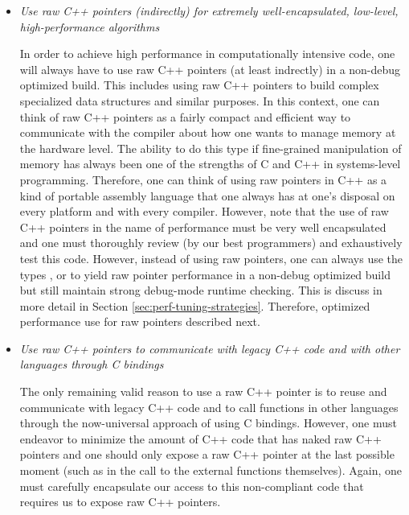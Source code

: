 \documentclass[pdf,ps2pdf,11pt]{SANDreport}
\begin{document}
\begin{itemize}

{}\item{}\textit{Use raw C++ pointers (indirectly) for extremely
well-encapsulated, low-level, high-performance algorithms}

In order to achieve high performance in computationally intensive
code, one will always have to use raw C++ pointers (at least
indrectly) in a non-debug optimized build.  This includes using raw
C++ pointers to build complex specialized data structures and similar
purposes.  In this context, one can think of raw C++ pointers as a
fairly compact and efficient way to communicate with the compiler
about how one wants to manage memory at the hardware level.  The
ability to do this type if fine-grained manipulation of memory has
always been one of the strengths of C and C++ in systems-level
programming.  Therefore, one can think of using raw pointers in C++ as
a kind of portable assembly language that one always has at one's
disposal on every platform and with every compiler.  However, note
that the use of raw C++ pointers in the name of performance must be
very well encapsulated and one must thoroughly review (by our best
programmers) and exhaustively test this code.  However, instead of
using raw pointers, one can always use the types {},
{} or {} to yield raw
pointer performance in a non-debug optimized build but still maintain
strong debug-mode runtime checking.  This is discuss in more detail in
Section {}\ref{sec:perf-tuning-strategies}.  Therefore, optimized
performance use for raw pointers described next.

{}\item{}\textit{Use raw C++ pointers to communicate with legacy C++
code and with other languages through C bindings}

The only remaining valid reason to use a raw C++ pointer is to reuse
and communicate with legacy C++ code and to call functions in other
languages through the now-universal approach of using C bindings.
However, one must endeavor to minimize the amount of C++ code that has
naked raw C++ pointers and one should only expose a raw C++ pointer at
the last possible moment (such as in the call to the external
functions themselves).  Again, one must carefully encapsulate our
access to this non-compliant code that requires us to expose raw C++
pointers.

\end{itemize}
\end{document}
